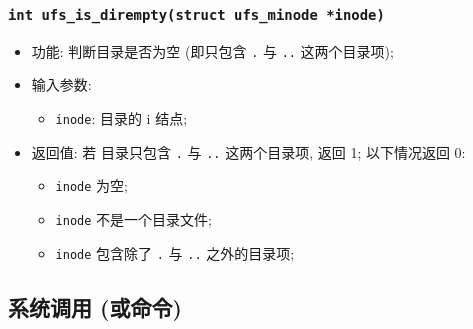 \documentclass[nofonts, titlepage]{ctexart}
\begin{document}
  \subsubsection[\texttt{ufs\_is\_dirempty}]{\texttt{int ufs\_is\_dirempty(struct ufs\_minode *inode)}}

  \begin{itemize}
\item
  功能: 判断目录是否为空 (即只包含 \texttt{.} 与 \texttt{..}
  这两个目录项);
\item
  输入参数:

  \begin{itemize}
  \item
    \texttt{inode}: 目录的 i 结点;
  \end{itemize}
\item
  返回值: 若 目录只包含 \texttt{.} 与 \texttt{..} 这两个目录项, 返回 1;
  以下情况返回 0:

  \begin{itemize}
  \item
    \texttt{inode} 为空;
  \item
    \texttt{inode} 不是一个目录文件;
  \item
    \texttt{inode} 包含除了 \texttt{.} 与 \texttt{..} 之外的目录项;
  \end{itemize}
  \end{itemize}

\subsection{系统调用 (或命令)}
\label{ux529fux80fdux51fdux6570-ux6216ux547dux4ee4}
\end{document}
